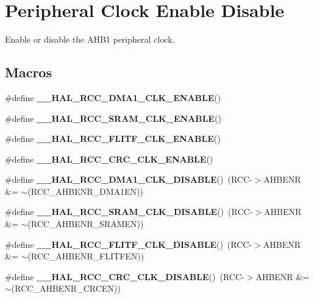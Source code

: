 \hypertarget{group___r_c_c___peripheral___clock___enable___disable}{}\section{Peripheral Clock Enable Disable}
\label{group___r_c_c___peripheral___clock___enable___disable}


Enable or disable the A\+H\+B1 peripheral clock.  


\subsection*{Macros}
\begin{DoxyCompactItemize}
\item 
\#define {\bfseries \+\_\+\+\_\+\+H\+A\+L\+\_\+\+R\+C\+C\+\_\+\+D\+M\+A1\+\_\+\+C\+L\+K\+\_\+\+E\+N\+A\+B\+LE}()
\item 
\#define {\bfseries \+\_\+\+\_\+\+H\+A\+L\+\_\+\+R\+C\+C\+\_\+\+S\+R\+A\+M\+\_\+\+C\+L\+K\+\_\+\+E\+N\+A\+B\+LE}()
\item 
\#define {\bfseries \+\_\+\+\_\+\+H\+A\+L\+\_\+\+R\+C\+C\+\_\+\+F\+L\+I\+T\+F\+\_\+\+C\+L\+K\+\_\+\+E\+N\+A\+B\+LE}()
\item 
\#define {\bfseries \+\_\+\+\_\+\+H\+A\+L\+\_\+\+R\+C\+C\+\_\+\+C\+R\+C\+\_\+\+C\+L\+K\+\_\+\+E\+N\+A\+B\+LE}()
\item 
\mbox{\label{group___r_c_c___peripheral___clock___enable___disable_ga569dc8b9e178a8afab2664fdf87f46c5}} 
\#define {\bfseries \+\_\+\+\_\+\+H\+A\+L\+\_\+\+R\+C\+C\+\_\+\+D\+M\+A1\+\_\+\+C\+L\+K\+\_\+\+D\+I\+S\+A\+B\+LE}()~(R\+CC-\/$>$A\+H\+B\+E\+NR \&= $\sim$(R\+C\+C\+\_\+\+A\+H\+B\+E\+N\+R\+\_\+\+D\+M\+A1\+EN))
\item 
\mbox{\label{group___r_c_c___peripheral___clock___enable___disable_ga429ce8eecde9788d3daf85226b5c171b}} 
\#define {\bfseries \+\_\+\+\_\+\+H\+A\+L\+\_\+\+R\+C\+C\+\_\+\+S\+R\+A\+M\+\_\+\+C\+L\+K\+\_\+\+D\+I\+S\+A\+B\+LE}()~(R\+CC-\/$>$A\+H\+B\+E\+NR \&= $\sim$(R\+C\+C\+\_\+\+A\+H\+B\+E\+N\+R\+\_\+\+S\+R\+A\+M\+EN))
\item 
\mbox{\label{group___r_c_c___peripheral___clock___enable___disable_ga3ecbf76738d7f2b8deb65847614f7574}} 
\#define {\bfseries \+\_\+\+\_\+\+H\+A\+L\+\_\+\+R\+C\+C\+\_\+\+F\+L\+I\+T\+F\+\_\+\+C\+L\+K\+\_\+\+D\+I\+S\+A\+B\+LE}()~(R\+CC-\/$>$A\+H\+B\+E\+NR \&= $\sim$(R\+C\+C\+\_\+\+A\+H\+B\+E\+N\+R\+\_\+\+F\+L\+I\+T\+F\+EN))
\item 
\mbox{\label{group___r_c_c___peripheral___clock___enable___disable_ga170a30954a78a81a8f9b381378e0c9af}} 
\#define {\bfseries \+\_\+\+\_\+\+H\+A\+L\+\_\+\+R\+C\+C\+\_\+\+C\+R\+C\+\_\+\+C\+L\+K\+\_\+\+D\+I\+S\+A\+B\+LE}()~(R\+CC-\/$>$A\+H\+B\+E\+NR \&= $\sim$(R\+C\+C\+\_\+\+A\+H\+B\+E\+N\+R\+\_\+\+C\+R\+C\+EN))
\end{DoxyCompactItemize}
